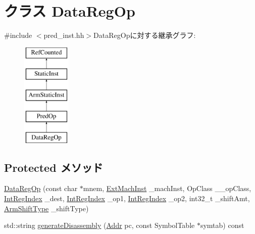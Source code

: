 \hypertarget{classArmISA_1_1DataRegOp}{
\section{クラス DataRegOp}
\label{classArmISA_1_1DataRegOp}
}


{\ttfamily \#include $<$pred\_\-inst.hh$>$}DataRegOpに対する継承グラフ:\begin{figure}[H]
\begin{center}
\leavevmode
\includegraphics[height=5cm]{classArmISA_1_1DataRegOp}
\end{center}
\end{figure}
\subsection*{Protected メソッド}
\begin{DoxyCompactItemize}
\item 
\hyperlink{classArmISA_1_1DataRegOp_aee3bd55c5e2d17e3a152a2b82aaa8d53}{DataRegOp} (const char $\ast$mnem, \hyperlink{classStaticInst_a5605d4fc727eae9e595325c90c0ec108}{ExtMachInst} \_\-machInst, OpClass \_\-\_\-opClass, \hyperlink{namespaceArmISA_ae64680ba9fb526106829d6bf92fc791b}{IntRegIndex} \_\-dest, \hyperlink{namespaceArmISA_ae64680ba9fb526106829d6bf92fc791b}{IntRegIndex} \_\-op1, \hyperlink{namespaceArmISA_ae64680ba9fb526106829d6bf92fc791b}{IntRegIndex} \_\-op2, int32\_\-t \_\-shiftAmt, \hyperlink{namespaceArmISA_a209d79feaaef0aa2f54ae62e53ee90de}{ArmShiftType} \_\-shiftType)
\item 
std::string \hyperlink{classArmISA_1_1DataRegOp_a95d323a22a5f07e14d6b4c9385a91896}{generateDisassembly} (\hyperlink{classm5_1_1params_1_1Addr}{Addr} pc, const SymbolTable $\ast$symtab) const 
\end{DoxyCompactItemize}
